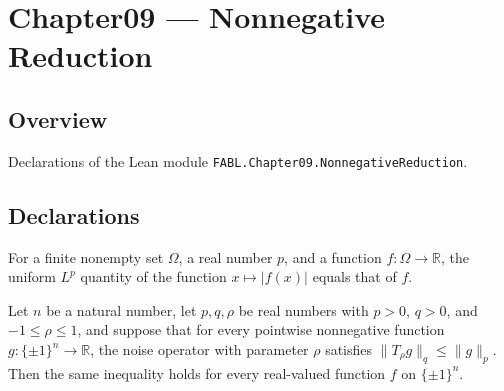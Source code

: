 \chapter{Chapter09 — Nonnegative Reduction}
\section{Overview}

Declarations of the Lean module \texttt{FABL.Chapter09.NonnegativeReduction}.

\section{Declarations}

\begin{theorem}
\label{FABL.uniformLpNorm_abs}
\leanok
{}
For a finite nonempty set $\Omega$, a real number $p$, and a function
$f:\Omega\to\mathbb{R}$, the uniform $L^p$ quantity of the function $x\mapsto |f(x)|$
equals that of $f$.
\end{theorem}

\begin{theorem}
\label{FABL.exercise9_7_nonnegative_reduction}
\leanok
{}
Let $n$ be a natural number, let $p,q,\rho$ be real numbers with $p>0$, $q>0$, and
$-1\leq\rho\leq1$, and suppose that for every pointwise nonnegative function
$g:\{\pm1\}^n\to\mathbb R$, the noise operator with parameter $\rho$ satisfies $\|T_\rho
g\|_q\leq\|g\|_p$. Then the same inequality holds for every real-valued function $f$ on
$\{\pm1\}^n$.
\end{theorem}
